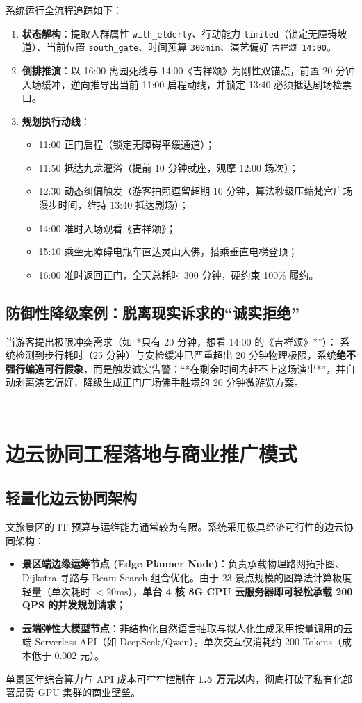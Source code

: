 \documentclass[11pt,a4paper]{ctexart}
\begin{document}
系统运行全流程追踪如下：
\begin{enumerate}
    \item \textbf{状态解构}：提取人群属性 \texttt{with\_elderly}、行动能力 \texttt{limited}（锁定无障碍坡道）、当前位置 \texttt{south\_gate}、时间预算 \texttt{300min}、演艺偏好 \texttt{吉祥颂 14:00}。
    \item \textbf{倒排推演}：以 16:00 离园死线与 14:00《吉祥颂》为刚性双锚点，前置 20 分钟入场缓冲，逆向推导出当前 11:00 启程动线，并锁定 13:40 必须抵达剧场检票口。
    \item \textbf{规划执行动线}：
    \begin{itemize}[noitemsep]
        \item 11:00 正门启程（锁定无障碍平缓通道）；
        \item 11:50 抵达九龙灌浴（提前 10 分钟就座，观摩 12:00 场次）；
        \item 12:30 动态纠偏触发（游客拍照逗留超期 10 分钟，算法秒级压缩梵宫广场漫步时间，维持 13:40 抵达剧场）；
        \item 14:00 准时入场观看《吉祥颂》；
        \item 15:10 乘坐无障碍电瓶车直达灵山大佛，搭乘垂直电梯登顶；
        \item 16:00 准时返回正门，全天总耗时 300 分钟，硬约束 100\% 履约。
    \end{itemize}
\end{enumerate}

\subsection{防御性降级案例：脱离现实诉求的“诚实拒绝”}
当游客提出极限冲突需求（如“*只有 20 分钟，想看 14:00 的《吉祥颂》*”）：
系统检测到步行耗时（25 分钟）与安检缓冲已严重超出 20 分钟物理极限，系统\textbf{绝不强行编造可行假象}，而是触发诚实告警：“*在剩余时间内赶不上这场演出*”，并自动剥离演艺偏好，降级生成正门广场佛手胜境的 20 分钟微游览方案。

---

\section{边云协同工程落地与商业推广模式}

\subsection{轻量化边云协同架构}
文旅景区的 IT 预算与运维能力通常较为有限。系统采用极具经济可行性的边云协同架构：
\begin{itemize}
    \item \textbf{景区端边缘运筹节点 (Edge Planner Node)}：负责承载物理路网拓扑图、Dijkstra 寻路与 Beam Search 组合优化。由于 23 景点规模的图算法计算极度轻量（单次耗时 $<20\text{ms}$），\textbf{单台 4 核 8G CPU 云服务器即可轻松承载 200 QPS 的并发规划请求}；
    \item \textbf{云端弹性大模型节点}：非结构化自然语言抽取与拟人化生成采用按量调用的云端 Serverless API（如 DeepSeek/Qwen）。单次交互仅消耗约 200 Tokens（成本低于 0.002 元）。
\end{itemize}
单景区年综合算力与 API 成本可牢牢控制在 \textbf{1.5 万元以内}，彻底打破了私有化部署昂贵 GPU 集群的商业壁垒。
\end{document}
